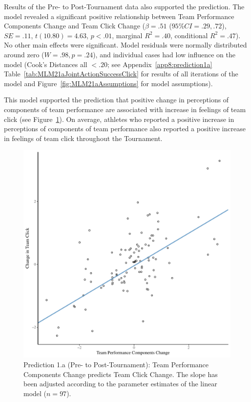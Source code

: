 \begin{CJK}{UTF8}{gbsn}
Results of the Pre- to Post-Tournament data also supported the prediction.  The model revealed a significant positive relationship between Team Performance Components Change and Team Click Change ($\beta = .51$ ($95\% CI =  .29, .72$), $SE = .11$, $t(10.80) = 4.63$, $p < .01$, marginal $R^2 = .40$, conditional $R^2 = .47$).  No other main effects were significant.  Model residuals were normally distributed around zero ($W = .98, p = .24$), and individual cases had low influence on the model (Cook's Distances all  $< .20 $; see Appendix~\ref{app8:prediction1a} Table~\ref{tab:MLM21aJointActionSuccessClick} for results of all iterations of the model and Figure~\ref{fig:MLM21aAssumptions} for model assumptions).

This model supported the prediction that positive change in perceptions of components of team performance are associated with increase in feelings of team click (see Figure~\ref{fig:jasClickDeltaModelSLope}).  On average, athletes who reported a positive increase in perceptions of components of team performance also reported a positive increase in feelings of team click throughout the Tournament.

\begin{figure}[htbp]
  \centering
\includegraphics[scale=.5]{images/jasClickDeltaModelSlope}
  \caption{Prediction 1.a (Pre- to Post-Tournament): Team Performance Components Change predicts Team Click Change. The slope has been adjusted according to the parameter estimates of the linear model ($n = 97$).}
  \label{fig:jasClickDeltaModelSLope}
\end{figure}


\end{CJK}
